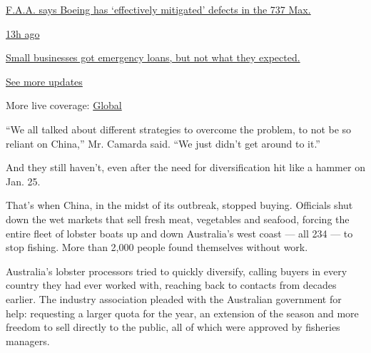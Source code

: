 \href{https://www.nytimes.com/live/2020/08/03/business/stock-market-today-coronavirus?action=click\&pgtype=Article\&state=default\&region=MAIN_CONTENT_1\&context=storylines_live_updates\#faa-says-boeing-has-effectively-mitigated-defects-in-the-737-max}{F.A.A.
says Boeing has `effectively mitigated' defects in the 737 Max.}

\href{https://www.nytimes.com/live/2020/08/03/business/stock-market-today-coronavirus?action=click\&pgtype=Article\&state=default\&region=MAIN_CONTENT_1\&context=storylines_live_updates\#small-businesses-got-emergency-loans-but-not-what-they-expected}{13h
ago}

\href{https://www.nytimes.com/live/2020/08/03/business/stock-market-today-coronavirus?action=click\&pgtype=Article\&state=default\&region=MAIN_CONTENT_1\&context=storylines_live_updates\#small-businesses-got-emergency-loans-but-not-what-they-expected}{Small
businesses got emergency loans, but not what they expected.}

\href{https://www.nytimes.com/live/2020/08/03/business/stock-market-today-coronavirus?action=click\&pgtype=Article\&state=default\&region=MAIN_CONTENT_1\&context=storylines_live_updates}{See
more updates}

More live coverage:
\href{https://www.nytimes.com/2020/08/03/world/coronavirus-covid-19.html?action=click\&pgtype=Article\&state=default\&region=MAIN_CONTENT_1\&context=storylines_live_updates}{Global}

``We all talked about different strategies to overcome the problem, to
not be so reliant on China,'' Mr. Camarda said. ``We just didn't get
around to it.''

And they still haven't, even after the need for diversification hit like
a hammer on Jan. 25.

That's when China, in the midst of its outbreak, stopped buying.
Officials shut down the wet markets that sell fresh meat, vegetables and
seafood, forcing the entire fleet of lobster boats up and down
Australia's west coast --- all 234 --- to stop fishing. More than 2,000
people found themselves without work.

Australia's lobster processors tried to quickly diversify, calling
buyers in every country they had ever worked with, reaching back to
contacts from decades earlier. The industry association pleaded with the
Australian government for help: requesting a larger quota for the year,
an extension of the season and more freedom to sell directly to the
public, all of which were approved by fisheries managers.


